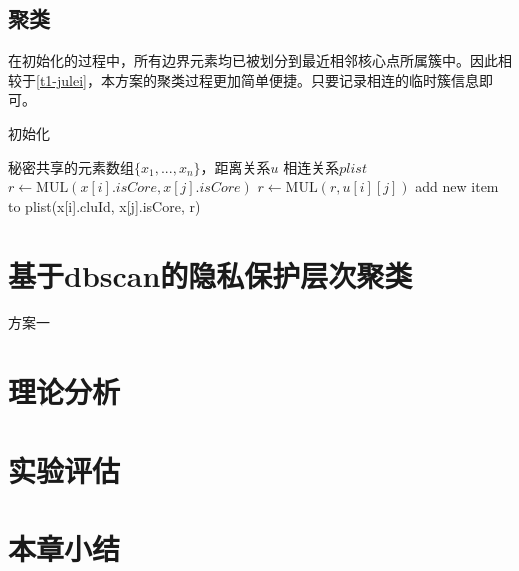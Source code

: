 \subsection{聚类}
在初始化的过程中，所有边界元素均已被划分到最近相邻核心点所属簇中。因此相较于\ref{t1-julei}，本方案的聚类过程更加简单便捷。只要记录相连的临时簇信息即可。
\begin{algorithm}[htbp]
	\renewcommand{\algorithmicrequire}{\textbf{输入:}}
	\renewcommand{\algorithmicensure}{\textbf{输出:}}
	\caption{初始化}
	\label{alg_t2_julei}
	\begin{algorithmic}[1]
		\REQUIRE 秘密共享的元素数组$ \{x_1,...,x_n\} $，距离关系$ u $
		\ENSURE 相连关系$ plist $
		\STATE $ r \leftarrow \text{MUL}(x[i].isCore, x[j].isCore) $
		\STATE $ r \leftarrow \text{MUL}(r, u[i][j]) $
		\STATE add new item to plist(x[i].cluId, x[j].isCore, r)
		\ENDFOR
		\ENDFOR
	\end{algorithmic}
\end{algorithm}
\section{基于dbscan的隐私保护层次聚类}
\label{s4-t3}
方案一
\section{理论分析}
\label{s4-lilun}
\section{实验评估}
\label{s4-shiyan}
\section{本章小结}
\label{s4-xiaojie}